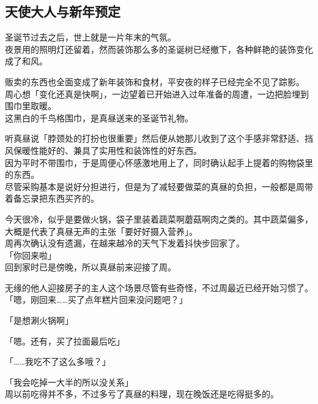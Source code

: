\subsection{天使大人与新年预定}

圣诞节过去之后，世上就是一片年末的气氛。\\

夜景用的照明灯还留着，然而装饰那么多的圣诞树已经撤下，各种鲜艳的装饰变化成了和风。

贩卖的东西也全面变成了新年装饰和食材，平安夜的样子已经完全不见了踪影。\\

周心想「变化还真是快啊」，一边望着已开始进入过年准备的周遭，一边把脸埋到围巾里取暖。\\

这黑白的千鸟格围巾，是真昼送来的圣诞节礼物。

听真昼说「脖颈处的打扮也很重要」然后便从她那儿收到了这个手感非常舒适、挡风保暖性能好的、兼具了实用性和装饰性的好东西。\\

因为平时不带围巾，于是周便心怀感激地用上了，同时确认起手上提着的购物袋里的东西。\\

尽管采购基本是说好分担进行，但是为了减轻要做菜的真昼的负担，一般都是周带着备忘录把东西买齐的。

今天很冷，似乎是要做火锅，袋子里装着蔬菜啊蘑菇啊肉之类的。其中蔬菜偏多，大概是代表了真昼无声的主张「要好好摄入营养」。\\

周再次确认没有遗漏，在越来越冷的天气下发着抖快步回家了。\\

「你回来啦」\\

回到家时已是傍晚，所以真昼前来迎接了周。

无缘的他人迎接房子的主人这个场景尽管有些奇怪，不过周最近已经开始习惯了。\\

「嗯，刚回来……买了点年糕片回来没问题吧？」

「是想涮火锅啊」

「嗯。还有，买了拉面最后吃」

「……我吃不了这么多哦？」

「我会吃掉一大半的所以没关系」\\

周以前吃得并不多，不过多亏了真昼的料理，现在晚饭还是吃得挺多的。\\


